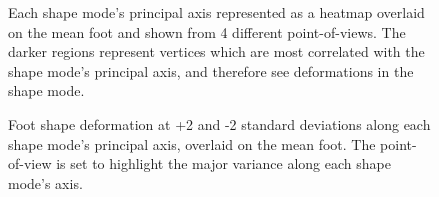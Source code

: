 \documentclass[preprint]{elsarticle}
\begin{document}
\begin{figure}
\hypertarget{fig:pca_quad}{%
\centering
\caption{Each shape mode's principal axis represented as a heatmap overlaid on the mean foot and shown from 4 different point-of-views. The darker regions represent vertices which are most correlated with the shape mode's principal axis, and therefore see deformations in the shape mode.}\label{fig:pca_quad}
}
\end{figure}

\begin{figure}
\hypertarget{fig:pca_overlay}{%
\centering
\caption{Foot shape deformation at +2 and -2 standard deviations along each shape mode's principal axis, overlaid on the mean foot. The point-of-view is set to highlight the major variance along each shape mode's axis.}\label{fig:pca_overlay}
}
\end{figure}
\end{document}
